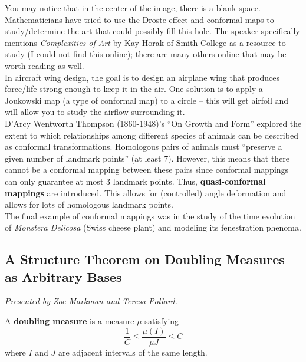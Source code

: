 \documentclass[12pt]{amsart}
\begin{document}
You may notice that in the center of the image, there is a blank space. Mathematicians have tried to use the Droste effect and conformal maps to study/determine the art that could possibly fill this hole. The speaker specifically mentions \textit{Complexities of Art} by Kay Horak of Smith College as a resource to study (I could not find this online); 
there are many others online that may be worth reading as well. \\

In aircraft wing design, the goal is to design an airplane wing that produces force/life strong enough to keep it in the air. One solution is to apply a Joukowski map (a type of conformal map) to a circle -- this will get airfoil and will allow you to study the airflow surrounding it. \\

D'Arcy Wentworth Thompson (1860-1948)'s ``On Growth and Form'' explored the extent to which relationships among different species of animals can be described as conformal transformations. Homologous pairs of animals must ``preserve a given number of landmark points'' (at least 7). However, this means that there cannot be a conformal mapping between 
these pairs since conformal mappings can only guarantee at most 3 landmark points. Thus, \textbf{quasi-conformal mappings} are introduced. This allows for (controlled) angle deformation and allows for lots of homologous landmark points. \\

The final example of conformal mappings was in the study of the time evolution of \textit{Monstera Delicosa} (Swiss cheese plant) and modeling its fenestration phenoma. \\

\newpage

\subsection{A Structure Theorem on Doubling Measures as Arbitrary Bases}

\textit{}

\vspace{0.25cm}
\textit{Presented by Zoe Markman and Teresa Pollard.} \\

\begin{definition}
A \textbf{doubling measure} is a measure $\mu$ satisfying \[ \frac{1}{C} \leq \frac{\mu(I)}{\mu{J}} \leq C \]
where $I$ and $J$ are adjacent intervals of the same length.
\end{definition}
\end{document}
